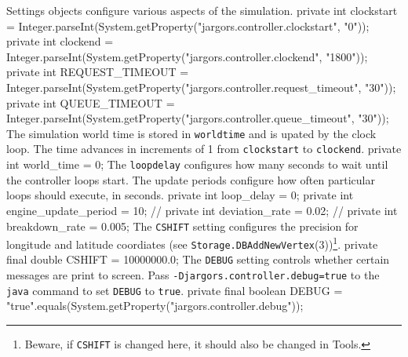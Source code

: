  Settings objects configure various aspects of the simulation.
\nwenddocs{}\endmoddef{}
private int clockstart =
    Integer.parseInt(System.getProperty("jargors.controller.clockstart", "0"));
private int clockend =
    Integer.parseInt(System.getProperty("jargors.controller.clockend", "1800"));
private int REQUEST_TIMEOUT =
    Integer.parseInt(System.getProperty("jargors.controller.request_timeout", "30"));
private int QUEUE_TIMEOUT =
    Integer.parseInt(System.getProperty("jargors.controller.queue_timeout", "30"));
\nwendcode{}\nwdocspar
The simulation world time is stored in {\tt{}world{}time} and is upated by the
clock loop. The time advances in increments of 1 from {\tt{}clockstart}
to {\tt{}clockend}.
\nwenddocs{}\plusendmoddef
private int world_time = 0;
\nwendcode{}\nwdocspar
The {\tt{}loop{}delay} configures how many seconds to wait until the controller
loops start. The update periods configure how often particular loops should
execute, in seconds.
\nwenddocs{}\plusendmoddef
private int loop_delay = 0;
private int engine_update_period = 10;
// private int deviation_rate = 0.02;
// private int breakdown_rate = 0.005;
\nwendcode{}\nwdocspar
The {\tt{}CSHIFT} setting configures the precision for longitude and latitude
coordiates (see {\tt{}Storage.\protect{}DBAddNewVertex}(3))\footnote{Beware, if {\tt{}CSHIFT}
is changed here, it should also be changed in Tools.}.
\nwenddocs{}\plusendmoddef
private final double CSHIFT = 10000000.0;
\nwendcode{}\nwdocspar
The {\tt{}DEBUG} setting controls whether certain messages are print to screen.
Pass {\tt{}-Djargors.controller.debug=true} to the {\tt{}java} command to set
{\tt{}DEBUG} to {\tt{}true}.
\nwenddocs{}\plusendmoddef
private final boolean DEBUG =
    "true".equals(System.getProperty("jargors.controller.debug"));
\nwendcode{}\nwdocspar

